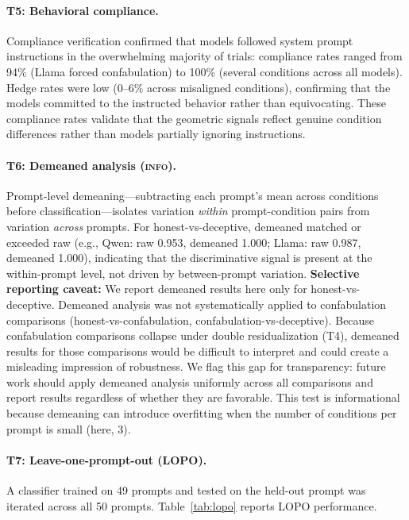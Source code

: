 \paragraph{T5: Behavioral compliance.}
Compliance verification confirmed that models followed system prompt instructions in the overwhelming majority of trials: compliance rates ranged from 94\% (Llama forced confabulation) to 100\% (several conditions across all models).
Hedge rates were low (0--6\% across misaligned conditions), confirming that the models committed to the instructed behavior rather than equivocating.
These compliance rates validate that the geometric signals reflect genuine condition differences rather than models partially ignoring instructions.

\paragraph{T6: Demeaned analysis (\textsc{info}).}
Prompt-level demeaning---subtracting each prompt's mean across conditions before classification---isolates variation \emph{within} prompt-condition pairs from variation \emph{across} prompts.
For honest-vs-deceptive, demeaned \fwl \auroc matched or exceeded raw \fwl \auroc (e.g., Qwen: raw 0.953, demeaned 1.000; Llama: raw 0.987, demeaned 1.000), indicating that the discriminative signal is present at the within-prompt level, not driven by between-prompt variation.
\textbf{Selective reporting caveat:} We report demeaned results here only for honest-vs-deceptive.
Demeaned analysis was not systematically applied to confabulation comparisons (honest-vs-confabulation, confabulation-vs-deceptive).
Because confabulation comparisons collapse under double residualization (T4), demeaned results for those comparisons would be difficult to interpret and could create a misleading impression of robustness.
We flag this gap for transparency: future work should apply demeaned analysis uniformly across all comparisons and report results regardless of whether they are favorable.
This test is informational because demeaning can introduce overfitting when the number of conditions per prompt is small (here, 3).

\paragraph{T7: Leave-one-prompt-out (LOPO).}
A classifier trained on 49 prompts and tested on the held-out prompt was iterated across all 50 prompts.
Table~\ref{tab:lopo} reports LOPO performance.

